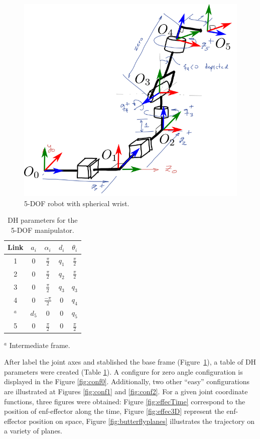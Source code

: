 \documentclass[a4paper,10pt]{article}
\begin{document}
\begin{figure}[H] 
 \centering
 \includegraphics[width=0.7\linewidth]{5DOF.png}
 \caption{5-DOF robot with spherical wrist.}\label{fig:5dof}
\end{figure}


\begin{table}[H]
\caption{DH parameters for the 5-DOF manipulator.}
\begin{center}
\label{table:DH}
\begin{tabular}{c c c c c} \hline
Link & $a_i$ & $\alpha_i$       & $d_i$ & $\theta_i$      \\ \hline \hline
1    & 0     & $\frac{\pi}{2}$  & $q_1$ & $\frac{\pi}{2}$ \\
2    & 0     & $\frac{\pi}{2}$  & $q_2$ & $\frac{\pi}{2}$ \\
3    & 0     & $\frac{\pi}{2}$  & $q_3$ & $q_3$           \\
4    & 0     & $\frac{-\pi}{2}$ & 0     & $q_4$           \\
$^a$     & $d_5$ & 0                & 0     & $q_5$           \\
5    & 0     & $\frac{\pi}{2}$  & 0     & $\frac{\pi}{2}$ \\ \hline
\end{tabular}
\end{center}
\centering
\footnotesize{$^a$ Intermediate frame.}\\
\end{table}

After label the joint axes and stablished the base frame (Figure~\ref{fig:5dof}), a table of DH parameters were created (Table \ref{table:DH}). A configure for zero angle configuration is displayed in the Figure \ref{fig:conf0}. Additionally, two other ``easy'' configurations are illustrated at Figures \ref{fig:conf1} and \ref{fig:conf2}.
For a given joint coordinate functions, three figures were obtained: Figure \ref{fig:effecTime} correspond to the position of enf-effector along the time, Figure \ref{fig:effec3D} represent the enf-effector position on space, Figure \ref{fig:butterflyplanes} illustrates the trajectory on a variety of planes.
\end{document}
